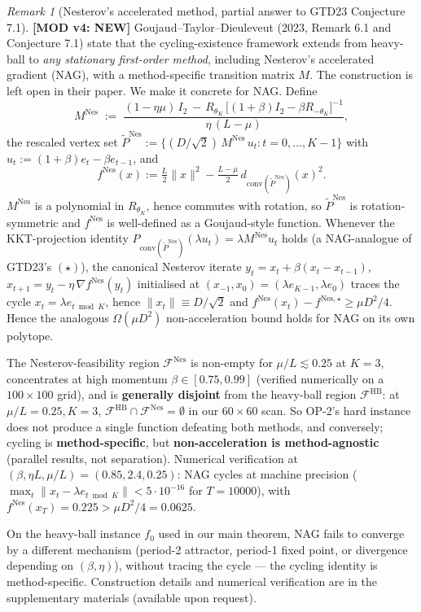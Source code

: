 \documentclass[11pt,a4paper]{article}
\theoremstyle{plain}
\theoremstyle{definition}
\theoremstyle{remark}
\newtheorem{remark}[theorem]{Remark}
\newcommand{\conv}{\mathrm{conv}}
\newcommand{\F}{\mathcal{F}}
\begin{document}
\begin{remark}[Nesterov's accelerated method, partial answer to GTD23 Conjecture 7.1]
\label{rem:4.1.1}
\textbf{[MOD v4: NEW]} Goujaud--Taylor--Dieuleveut (2023, Remark 6.1 and Conjecture 7.1) state that the cycling-existence framework extends from heavy-ball to \emph{any stationary first-order method}, including Nesterov's accelerated gradient (NAG), with a method-specific transition matrix $M$. The construction is left open in their paper. We make it concrete for NAG. Define
\[
M^{\mathrm{Nes}} \;:=\; \frac{(1-\eta\mu)\,I_2 \,-\, R_{\theta_K}\,\big[(1+\beta)I_2 - \beta R_{-\theta_K}\big]^{-1}}{\eta\,(L-\mu)},
\]
the rescaled vertex set $\widetilde P^{\mathrm{Nes}} := \{(D/\sqrt 2)\,M^{\mathrm{Nes}}\,u_t : t = 0, \ldots, K-1\}$ with $u_t := (1+\beta)e_t - \beta e_{t-1}$, and
\[
f^{\mathrm{Nes}}(x) := \tfrac{L}{2}\|x\|^2 - \tfrac{L-\mu}{2}\,d_{\conv(\widetilde P^{\mathrm{Nes}})}(x)^2.
\]
$M^{\mathrm{Nes}}$ is a polynomial in $R_{\theta_K}$, hence commutes with rotation, so $\widetilde P^{\mathrm{Nes}}$ is rotation-symmetric and $f^{\mathrm{Nes}}$ is well-defined as a Goujaud-style function. Whenever the KKT-projection identity $P_{\conv(\widetilde P^{\mathrm{Nes}})}(\lambda u_t) = \lambda M^{\mathrm{Nes}} u_t$ holds (a NAG-analogue of GTD23's $(\star)$), the canonical Nesterov iterate $y_t = x_t + \beta(x_t - x_{t-1})$, $x_{t+1} = y_t - \eta\,\nabla f^{\mathrm{Nes}}(y_t)$ initialised at $(x_{-1}, x_0) = (\lambda e_{K-1}, \lambda e_0)$ traces the cycle $x_t = \lambda e_{t \bmod K}$, hence $\|x_t\| \equiv D/\sqrt 2$ and $f^{\mathrm{Nes}}(x_t) - f^{\mathrm{Nes},\star} \geq \mu D^2/4$. Hence the analogous $\Omega(\mu D^2)$ non-acceleration bound holds for NAG on its own polytope.

The Nesterov-feasibility region $\F^{\mathrm{Nes}}$ is non-empty for $\mu/L \lesssim 0.25$ at $K=3$, concentrates at high momentum $\beta \in [0.75, 0.99]$ (verified numerically on a $100\times 100$ grid), and is \textbf{generally disjoint} from the heavy-ball region $\F^{\mathrm{HB}}$: at $\mu/L = 0.25, K = 3$, $\F^{\mathrm{HB}} \cap \F^{\mathrm{Nes}} = \emptyset$ in our $60 \times 60$ scan. So OP-2's hard instance does not produce a single function defeating both methods, and conversely; cycling is \textbf{method-specific}, but \textbf{non-acceleration is method-agnostic} (parallel results, not separation). Numerical verification at $(\beta, \eta L, \mu/L) = (0.85, 2.4, 0.25)$: NAG cycles at machine precision ($\max_t \|x_t - \lambda e_{t \bmod K}\| < 5 \cdot 10^{-16}$ for $T = 10000$), with $f^{\mathrm{Nes}}(x_T) = 0.225 > \mu D^2/4 = 0.0625$.

On the heavy-ball instance $f_0$ used in our main theorem, NAG fails to converge by a different mechanism (period-2 attractor, period-1 fixed point, or divergence depending on $(\beta,\eta)$), without tracing the cycle --- the cycling identity is method-specific. Construction details and numerical verification are in the supplementary materials (available upon request).
\end{remark}
\end{document}
